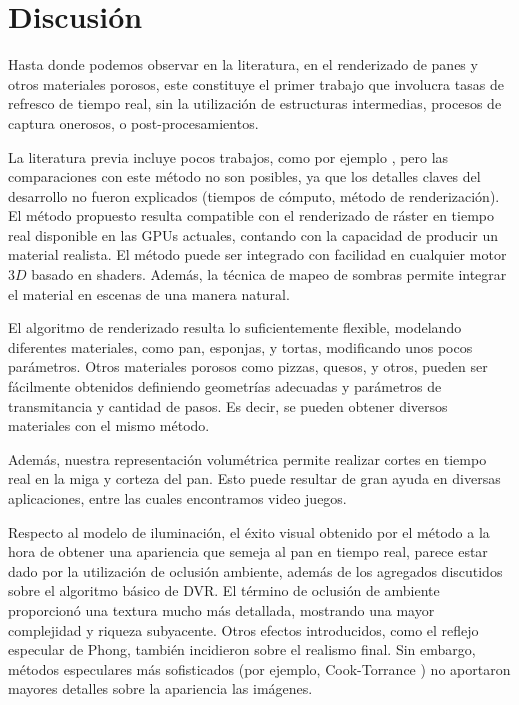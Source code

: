 \section{Discusión}


Hasta donde podemos observar en la literatura, en el renderizado de panes y otros materiales porosos, este constituye el primer trabajo que involucra tasas de refresco de tiempo real, sin la utilización de estructuras intermedias, procesos de captura onerosos, o post-procesamientos.

La literatura previa incluye pocos trabajos, como por ejemplo \cite{Cho2007}, pero las comparaciones con este método no son posibles, ya que los detalles claves del desarrollo no fueron explicados (tiempos de cómputo, método de renderización).
El método propuesto resulta compatible con el renderizado de ráster en tiempo real disponible en las GPUs actuales, contando con la capacidad de producir un material realista.
El método puede ser integrado con facilidad en cualquier motor $3D$ basado en shaders.
Además, la técnica de mapeo de sombras permite integrar el material en escenas de una manera natural.


El algoritmo de renderizado resulta lo suficientemente flexible, modelando diferentes materiales, como pan, esponjas, y tortas, modificando unos pocos parámetros.
Otros materiales porosos como pizzas, quesos, y otros, pueden ser fácilmente obtenidos definiendo geometrías adecuadas y parámetros de transmitancia y cantidad de pasos.
Es decir, se pueden obtener diversos materiales con el mismo método.

Además, nuestra representación volumétrica permite realizar cortes en tiempo real en la miga y corteza del pan.
Esto puede resultar de gran ayuda en diversas aplicaciones, entre las cuales encontramos video juegos.

Respecto al modelo de iluminación, el éxito visual obtenido por el método a la hora de obtener una apariencia que semeja al pan en tiempo real, parece estar dado por la utilización de oclusión ambiente, además de los agregados discutidos sobre el algoritmo básico de DVR.
El término de oclusión de ambiente proporcionó una textura mucho más detallada, mostrando una mayor complejidad y riqueza subyacente.
Otros efectos introducidos, como el reflejo especular de Phong, también incidieron sobre el realismo final.
Sin embargo, métodos especulares más sofisticados (por ejemplo, Cook-Torrance \cite{Cook1982}) no aportaron mayores detalles sobre la apariencia las imágenes.

